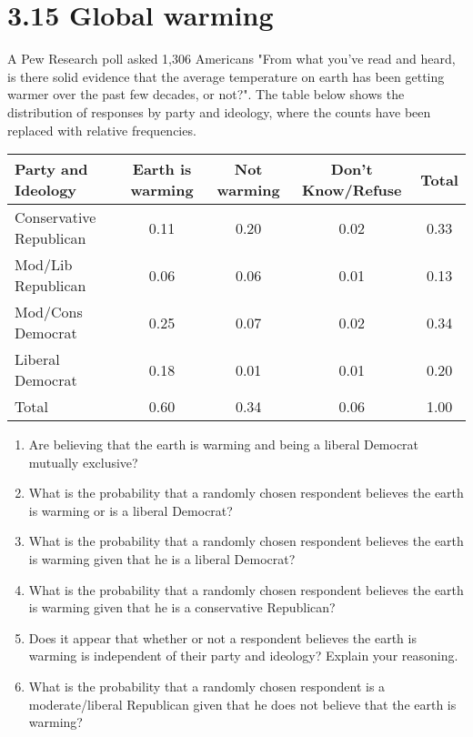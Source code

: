 \documentclass{article}
\begin{document}
\section*{3.15 Global warming}
A Pew Research poll asked 1,306 Americans "From what you've read and heard, is there solid evidence that the average temperature on earth has been getting warmer over the past few decades, or not?". The table below shows the distribution of responses by party and ideology, where the counts have been replaced with relative frequencies.

\begin{table}[H]
\centering
\settowidth{}
\setlength\extrarowheight{2pt}
\begin{tabulary}{1.0\linewidth}{|L|C|C|C|C|}
\hline
\textbf{Party and Ideology} & \textbf{Earth is warming} & \textbf{Not warming} & \textbf{Don't Know/Refuse} & \textbf{Total} \\
\hline
Conservative Republican & 0.11 & 0.20 & 0.02 & 0.33 \\
Mod/Lib Republican & 0.06 & 0.06 & 0.01 & 0.13 \\
Mod/Cons Democrat & 0.25 & 0.07 & 0.02 & 0.34 \\
Liberal Democrat & 0.18 & 0.01 & 0.01 & 0.20 \\
\hline
Total & 0.60 & 0.34 & 0.06 & 1.00 \\
\hline
\end{tabulary}
\end{table}


\begin{enumerate}
    \item[(a)] Are believing that the earth is warming and being a liberal Democrat mutually exclusive?
    \item[(b)] What is the probability that a randomly chosen respondent believes the earth is warming or is a liberal Democrat?
    \item[(c)] What is the probability that a randomly chosen respondent believes the earth is warming given that he is a liberal Democrat?
    \item[(d)] What is the probability that a randomly chosen respondent believes the earth is warming given that he is a conservative Republican?
    \item[(e)] Does it appear that whether or not a respondent believes the earth is warming is independent of their party and ideology? Explain your reasoning.
    \item[(f)] What is the probability that a randomly chosen respondent is a moderate/liberal Republican given that he does not believe that the earth is warming?
\end{enumerate}
\end{document}
